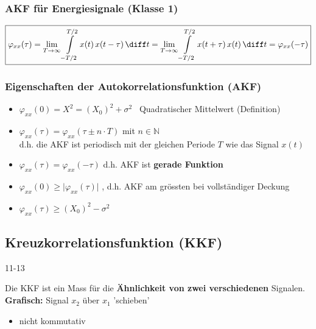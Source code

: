 \subsubsection{AKF für Energiesignale (Klasse 1)}

\vspace{-0.2cm}

$$ \boxed{ \varphi_{xx}(\tau) = \lim\limits_{T \to \infty}  \int\limits_{-T/2}^{T/2} x(t) \, x(t-\tau) \, \diff t 
    =  \lim\limits_{T \to \infty}  \int\limits_{-T/2}^{T/2} x(t+\tau) \,x(t) \, \diff t = \varphi_{xx}(-\tau) } $$


\subsubsection{Eigenschaften der Autokorrelationsfunktion (AKF)}

\begin{itemize}
    \setlength\itemsep{5pt}
    \item $\varphi_{xx}(0) = X^2 = (X_0)^2 + \sigma^2 $ \textrightarrow\ Quadratischer Mittelwert (Definition)
    \item $\varphi_{xx}(\tau) = \varphi_{xx}(\tau \pm n \cdot T)$ mit $n \in \mathbb{N}$ \\
        d.h. die AKF ist periodisch mit der gleichen Periode $T$ wie das Signal $x(t)$ 
    \item $\varphi_{xx}(\tau) = \varphi_{xx}(-\tau)$ d.h. AKF ist \textbf{gerade Funktion} 
    \item $\varphi_{xx}(0) \geq \vert \varphi_{xx}(\tau) \vert$ , d.h. AKF am grössten bei vollständiger Deckung
    \item $\varphi_{xx}(\tau) \geq (X_0)^2 - \sigma^2$ 
\end{itemize}

\subsection{Kreuzkorrelationsfunktion (KKF)}{11-13}

Die KKF ist ein Mass für die \textbf{Ähnlichkeit von zwei verschiedenen} Signalen. \\
\textbf{Grafisch:} Signal $x_2$ über $x_1$ 'schieben'

\begin{itemize}
   \item nicht kommutativ
\end{itemize}

\vspace{0.2cm}

